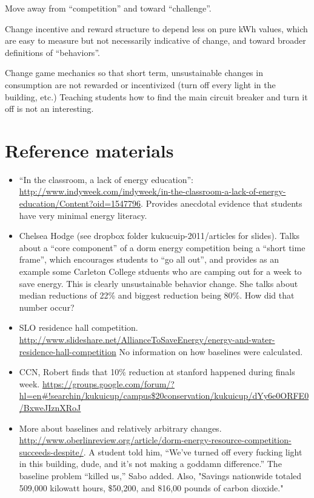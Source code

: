 \documentclass[jou]{apa} %
\begin{document}
Move away from ``competition'' and toward ``challenge''.

Change incentive and reward structure to depend less on pure kWh values, which are easy to
measure but not necessarily indicative of change, and toward broader definitions of
``behaviors''.

Change game mechanics so that short term, unsustainable changes in consumption are not
rewarded or incentivized (turn off every light in the building, etc.)   Teaching students
how to find the main circuit breaker and turn it off is not an interesting. 


\section{Reference materials}

\begin{itemize}

\item ``In the classroom, a lack of energy education'':
\url{http://www.indyweek.com/indyweek/in-the-classroom-a-lack-of-energy-education/Content?oid=1547796}.
Provides anecdotal evidence that students have very minimal energy literacy.

\item Chelsea Hodge (see dropbox folder kukucuip-2011/articles for slides).  Talks about a
  ``core component'' of a dorm energy competition being a ``short time frame'', which
  encourages students to ``go all out'', and provides as an example some Carleton College
  stduents who are camping out for a week to save energy.  This is clearly unsustainable
  behavior change. She talks about median reductions of 22\% and biggest reduction being
  80\%.  How did that number occur?

\item SLO residence hall competition.
\url{http://www.slideshare.net/AllianceToSaveEnergy/energy-and-water-residence-hall-competition}
No information on how baselines were calculated. 

\item CCN, Robert finds that 10\% reduction at stanford happened during finals week.
\url{https://groups.google.com/forum/?hl=en#!searchin/kukuicup/campus$20conservation/kukuicup/dYy6e0ORFE0/BxweJIznXRoJ}

\item More about baselines and relatively arbitrary changes.
\url{http://www.oberlinreview.org/article/dorm-energy-resource-competition-succeeds-despite/}.
A student told him, “We’ve turned off every fucking light in this building, dude, and it’s
not making a goddamn difference.” The baseline problem “killed us,” Sabo added.  Also, "Savings nationwide totaled 509,000 kilowatt hours, \$50,200, and 816,00 pounds of carbon dioxide."


\end{itemize}
\end{document}
